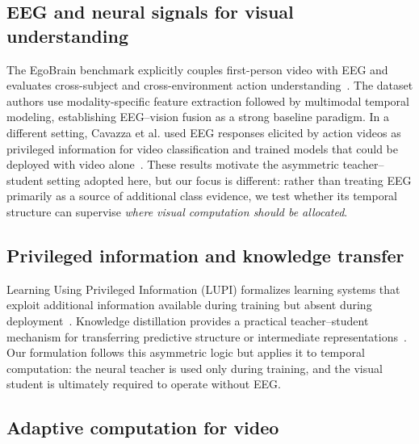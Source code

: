 \documentclass[runningheads]{llncs}
\begin{document}
\subsection{EEG and neural signals for visual understanding}

The EgoBrain benchmark explicitly couples first-person video with EEG and evaluates cross-subject and cross-environment action understanding~\cite{lin2026egobrain}. The dataset authors use modality-specific feature extraction followed by multimodal temporal modeling, establishing EEG--vision fusion as a strong baseline paradigm. In a different setting, Cavazza et al. used EEG responses elicited by action videos as privileged information for video classification and trained models that could be deployed with video alone~\cite{cavazza2022actions}. These results motivate the asymmetric teacher--student setting adopted here, but our focus is different: rather than treating EEG primarily as a source of additional class evidence, we test whether its temporal structure can supervise \emph{where visual computation should be allocated}.

\subsection{Privileged information and knowledge transfer}

Learning Using Privileged Information (LUPI) formalizes learning systems that exploit additional information available during training but absent during deployment~\cite{vapnik2009privileged}. Knowledge distillation provides a practical teacher--student mechanism for transferring predictive structure or intermediate representations~\cite{hinton2015distillation}. Our formulation follows this asymmetric logic but applies it to temporal computation: the neural teacher is used only during training, and the visual student is ultimately required to operate without EEG.

\subsection{Adaptive computation for video}
\end{document}

